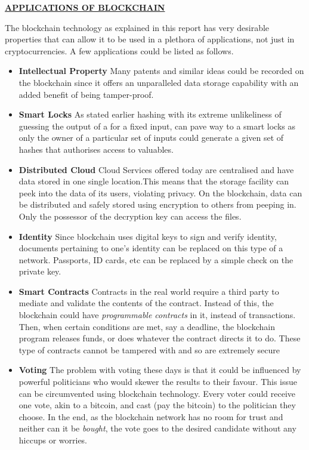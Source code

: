 \documentclass[12pt,a4paper]{report}
\begin{document}
\begin{justify}
\newpage
\begin{center}\underline{ \Large \textbf{APPLICATIONS OF BLOCKCHAIN}}\end{center}
\vspace{10mm}
The blockchain technology as explained in this report has very desirable properties that can allow it to be used in a plethora of applications, not just in cryptocurrencies. A few applications could be listed as follows.
\begin{itemize}
    \item \textbf{Intellectual Property} \newline
    Many patents and similar ideas could be recorded on the blockchain since it offers an unparalleled data storage capability with an added benefit of being tamper-proof.
    \item \textbf{Smart Locks} \newline
    As stated earlier hashing with its extreme unlikeliness of guessing the output of a for a fixed input, can pave way to a smart locks as only the owner of a particular set of inputs could generate a given set of hashes that authorises access to valuables.
    \item \textbf{Distributed Cloud} \newline
    Cloud Services offered today are centralised and have data stored in one single location.This means that the storage facility can peek into the data of its users, violating privacy. On the blockchain, data can be distributed and safely stored using encryption to others from peeping in. Only the possessor of the decryption key can access the files.
    \item \textbf{Identity} \newline
    Since blockchain uses digital keys to sign and verify identity, documents pertaining to one's identity can be replaced on this type of a network. Passports, ID cards, etc can be replaced by a simple check on the private key.
    
    \item \textbf{Smart Contracts} \newline
    Contracts in the real world require a third party to mediate and validate the contents of the contract. Instead of this, the blockchain could have \textit{programmable contracts} in it, instead of transactions. Then, when certain conditions are met, say a deadline, the blockchain program releases funds, or does whatever the contract directs it to do. These type of contracts cannot be tampered with and so are extremely secure
    \item \textbf{Voting} \newline
    The problem with voting these days is that it could be influenced by powerful politicians who would skewer the results to their favour. This issue can be circumvented using blockchain technology. Every voter could receive one vote, akin to a bitcoin, and cast (pay the bitcoin) to the politician they choose. In the end, as the blockchain network has no room for trust and neither can it be \textit{bought}, the vote goes to the desired candidate without any hiccups or worries. 
\end{itemize}


\end{justify}
\end{document}
